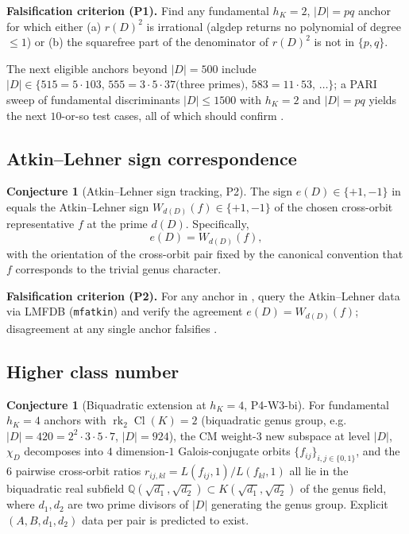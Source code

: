 \documentclass[11pt]{amsart}
\theoremstyle{definition}
\newtheorem{conjecture}[theorem]{Conjecture}
\theoremstyle{remark}
\DeclareMathOperator{\Cl}{Cl}
\DeclareMathOperator{\rk}{rk}
\newcommand{\Q}{\mathbb{Q}}
\newcommand{\chiD}{\chi_D}
\begin{document}
\textbf{Falsification criterion (P1).} Find any fundamental
\(h_{K} = 2\), \(|D| = pq\) anchor for which either (a) \(r(D)^{2}\)
is irrational (\textsf{algdep} returns no polynomial of degree
\(\le 1\)) or (b) the squarefree part of the denominator of
\(r(D)^{2}\) is not in \(\{p, q\}\).

The next eligible anchors beyond \(|D| = 500\) include
\(|D| \in \{515 = 5 \cdot 103,\, 555 = 3 \cdot 5 \cdot 37 \text{
(three primes)},\, 583 = 11 \cdot 53,\, \dots\}\); a PARI sweep of
fundamental discriminants \(|D| \le 1500\) with \(h_{K} = 2\) and
\(|D| = pq\) yields the next \(10\)-or-so test cases, all of which
should confirm .

\subsection{Atkin--Lehner sign correspondence}\label{ssec:ext-AL}

\begin{conjecture}[Atkin--Lehner sign tracking, P2]\label{conj:AL}
The sign \(e(D) \in \{+1, -1\}\) in
 equals the Atkin--Lehner sign
\(W_{d(D)}(f) \in \{+1, -1\}\) of the chosen cross-orbit
representative \(f\) at the prime \(d(D)\). Specifically,
\[
   e(D) = W_{d(D)}(f),
\]
with the orientation of the cross-orbit pair fixed by the
canonical convention that \(f\) corresponds to the trivial
genus character.
\end{conjecture}

\textbf{Falsification criterion (P2).} For any anchor in
, query the Atkin--Lehner data via LMFDB
(\texttt{mfatkin}) and verify the agreement \(e(D) = W_{d(D)}(f)\);
disagreement at any single anchor falsifies .

\subsection{Higher class number}\label{ssec:ext-hk}

\begin{conjecture}[Biquadratic extension at \(h_{K} = 4\),
P4-W3-bi]\label{conj:hk4}
For fundamental \(h_{K} = 4\) anchors with \(\rk_{2} \Cl(K) = 2\)
(biquadratic genus group, e.g.\ \(|D| = 420 = 2^{2} \cdot 3 \cdot
5 \cdot 7\), \(|D| = 924\)), the CM weight-\(3\) new subspace at
level \(|D|\), \(\chiD\) decomposes into \(4\) dimension-\(1\)
Galois-conjugate orbits \(\{f_{ij}\}_{i, j \in \{0, 1\}}\), and the
\(6\) pairwise cross-orbit ratios \(r_{ij, kl} = L(f_{ij}, 1)/
L(f_{kl}, 1)\) all lie in the biquadratic real subfield
\(\Q(\sqrt{d_{1}}, \sqrt{d_{2}}) \subset K(\sqrt{d_{1}}, \sqrt{d_{2}})\)
of the genus field, where \(d_{1}, d_{2}\) are two prime divisors of
\(|D|\) generating the genus group. Explicit \((A, B, d_{1}, d_{2})\)
data per pair is predicted to exist.
\end{conjecture}
\end{document}
